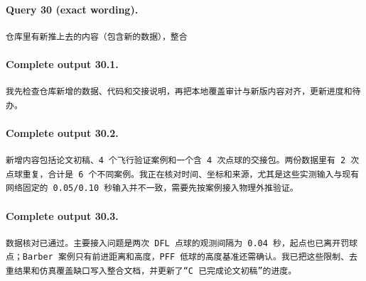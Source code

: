 \documentclass[UTF8,10pt]{ctexart}
\begin{document}
\paragraph{Query 30 (exact wording).}
\begin{Verbatim}[breaklines=true,breakanywhere=true,fontsize=\scriptsize,frame=single,framesep=2pt]
仓库里有新推上去的内容（包含新的数据），整合
\end{Verbatim}

\paragraph{Complete output 30.1.}
\begin{Verbatim}[breaklines=true,breakanywhere=true,fontsize=\scriptsize,frame=single,framesep=2pt]
我先检查仓库新增的数据、代码和交接说明，再把本地覆盖审计与新版内容对齐，更新进度和待办。
\end{Verbatim}

\paragraph{Complete output 30.2.}
\begin{Verbatim}[breaklines=true,breakanywhere=true,fontsize=\scriptsize,frame=single,framesep=2pt]
新增内容包括论文初稿、4 个飞行验证案例和一个含 4 次点球的交接包。两份数据里有 2 次点球重复，合计是 6 个不同案例。我正在核对时间、坐标和来源，尤其是这些实测输入与现有网络固定的 0.05/0.10 秒输入并不一致，需要先按案例接入物理外推验证。
\end{Verbatim}

\paragraph{Complete output 30.3.}
\begin{Verbatim}[breaklines=true,breakanywhere=true,fontsize=\scriptsize,frame=single,framesep=2pt]
数据核对已通过。主要接入问题是两次 DFL 点球的观测间隔为 0.04 秒，起点也已离开罚球点；Barber 案例只有前进距离和高度，PFF 低球的高度基准还需确认。我已把这些限制、去重结果和仿真覆盖缺口写入整合文档，并更新了“C 已完成论文初稿”的进度。
\end{Verbatim}
\end{document}
